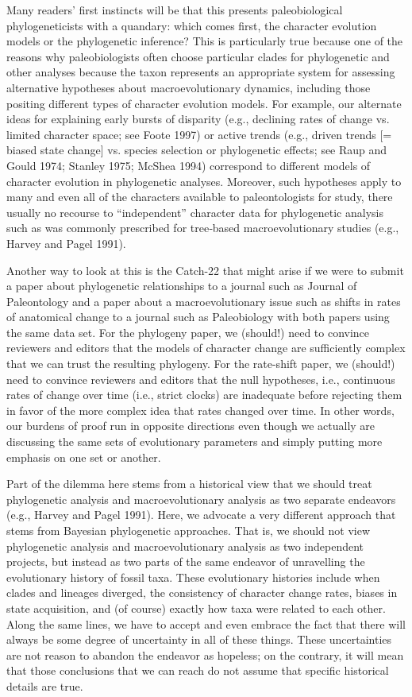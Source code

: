 \documentclass{article}
\begin{document}
Many readers’ first instincts will be that this presents paleobiological phylogeneticists with a quandary: which comes first, the character evolution models or the phylogenetic inference?  This is particularly true because one of the reasons why paleobiologists often choose particular clades for phylogenetic and other analyses because the taxon represents an appropriate system for assessing alternative hypotheses about macroevolutionary dynamics, including those positing different types of character evolution models.  For example, our alternate ideas for explaining early bursts of disparity (e.g., declining rates of change vs. limited character space; see Foote 1997) or active trends (e.g., driven trends [= biased state change] vs. species selection or phylogenetic effects; see Raup and Gould 1974; Stanley 1975; McShea 1994) correspond to different models of character evolution in phylogenetic analyses. Moreover, such hypotheses apply to many and even all of the characters available to paleontologists for study, there usually no recourse to “independent” character data for phylogenetic analysis such as was commonly prescribed for tree‑based macroevolutionary studies (e.g., Harvey and Pagel 1991).

Another way to look at this is the Catch-22 that might arise if we were to submit a paper about phylogenetic relationships to a journal such as Journal of Paleontology and a paper about a macroevolutionary issue such as shifts in rates of anatomical change to a journal such as Paleobiology with both papers using the same data set.  For the phylogeny paper, we (should!) need to convince reviewers and editors that the models of character change are sufficiently complex that we can trust the resulting phylogeny. For the rate-shift paper, we (should!) need to convince reviewers and editors that the null hypotheses, i.e., continuous rates of change over time (i.e., strict clocks) are inadequate before rejecting them in favor of the more complex idea that rates changed over time.  In other words, our burdens of proof run in opposite directions even though we actually are discussing the same sets of evolutionary parameters and simply putting more emphasis on one set or another.  

Part of the dilemma here stems from a historical view that we should treat phylogenetic analysis and macroevolutionary analysis as two separate endeavors (e.g., Harvey and Pagel 1991).  Here, we advocate a very different approach that stems from Bayesian phylogenetic approaches.  That is, we should not view phylogenetic analysis and macroevolutionary analysis as two independent projects, but instead as two parts of the same endeavor of unravelling the evolutionary history of fossil taxa.  These evolutionary histories include when clades and lineages diverged, the consistency of character change rates, biases in state acquisition, and (of course) exactly how taxa were related to each other.  Along the same lines, we have to accept and even embrace the fact that there will always be some degree of uncertainty in all of these things.  These uncertainties are not reason to abandon the endeavor as hopeless; on the contrary, it will mean that those conclusions that we can reach do not assume that specific historical details are true.  
\end{document}
